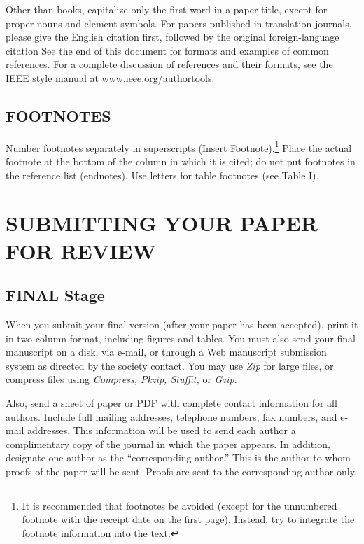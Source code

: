 \documentclass{IEEEoj-data}
\begin{document}
{Other than books, capitalize only the first word in a paper title, except 
for proper nouns and element symbols. For papers published in translation 
journals, please give the English citation first, followed by the original 
foreign-language citation See the end of this document for formats and 
examples of common references. For a complete discussion of references and 
their formats, see the IEEE style manual at www.ieee.org/authortools.


\subsection*{FOOTNOTES}
Number footnotes separately in superscripts (Insert\textbar 
Footnote).\footnote{It is recommended that footnotes be avoided (except for 
the unnumbered footnote with the receipt date on the first page). Instead, 
try to integrate the footnote information into the text.} Place the actual 
footnote at the bottom of the column in which it is cited; do not put 
footnotes in the reference list (endnotes). Use letters for table footnotes 
(see Table I). 

\section*{SUBMITTING YOUR PAPER FOR REVIEW}

\subsection*{FINAL Stage}
When you submit your final version (after your paper has been accepted), 
print it in two-column format, including figures and tables. You must also 
send your final manuscript on a disk, via e-mail, or through a Web 
manuscript submission system as directed by the society contact. You may use 
\textit{Zip} for large files, or compress files using \textit{Compress, Pkzip, Stuffit,} or \textit{Gzip.} 

Also, send a sheet of paper or PDF with complete contact information for all 
authors. Include full mailing addresses, telephone numbers, fax numbers, and 
e-mail addresses. This information will be used to send each author a 
complimentary copy of the journal in which the paper appears. In addition, 
designate one author as the ``corresponding author.'' This is the author to 
whom proofs of the paper will be sent. Proofs are sent to the corresponding 
author only.

}
\end{document}
